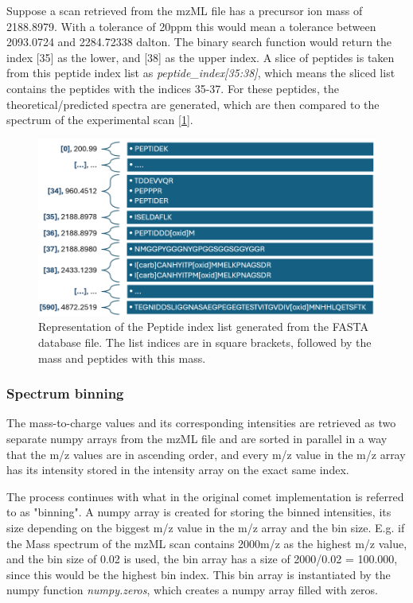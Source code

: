 \documentclass[11pt]{article}
\begin{document}
Suppose a scan retrieved from the mzML file has a precursor ion mass of 2188.8979. With a tolerance of 20ppm this would mean a tolerance between 2093.0724 and 2284.72338 dalton. The binary search function would return the index [35] as the lower, and [38] as the upper index. A slice of peptides is taken  from this peptide index list as \textit{peptide\_index[35:38]}, which means the sliced list contains the peptides with the indices 35-37. For these peptides, the theoretical/predicted spectra are generated, which are then compared to the spectrum of the experimental scan [\cref{fig:peptindex}].

\begin{figure}[ht]
\centering
\includegraphics[width=1\textwidth]{figs/pepindex.png}
\caption{Representation of the Peptide index list generated from the FASTA database file. The list indices are in square brackets, followed by the mass and peptides with this mass.}
\label{fig:peptindex}
\end{figure}

\subsubsection{Spectrum binning}\label{SpectBinningChapter}
The mass-to-charge values and its corresponding intensities are retrieved as two separate numpy arrays from the mzML file and are sorted in parallel in a way that the m/z values are in ascending order, and every m/z value in the m/z array has its intensity stored in the intensity array on the exact same index.

The process continues with what in the original comet implementation is referred to as "binning". A numpy array is created for storing the binned intensities, its size depending on the biggest m/z value in the m/z array and the bin size. E.g. if the Mass spectrum of the mzML scan contains 2000m/z as the highest m/z value, and the bin size of 0.02 is used, the bin array has a size of 2000/0.02 = 100.000, since this would be the highest bin index. This bin array is instantiated by the numpy function \textit{numpy.zeros}, which creates a numpy array filled with zeros.
\end{document}
